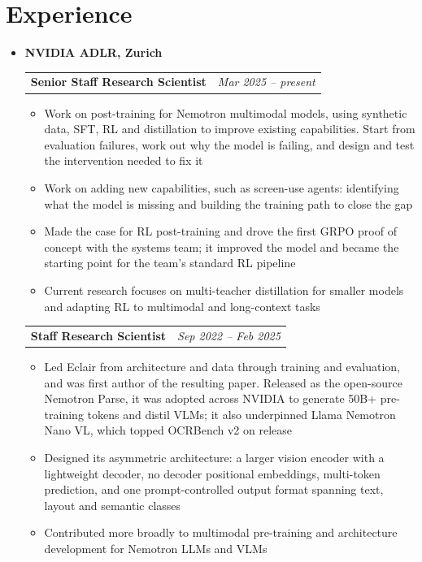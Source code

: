 \documentclass[letterpaper,11pt]{article}
\makeatletter
\newcommand{\cvcompany}[1]{
  \vspace{2pt}\item \textbf{#1} \\[1pt]
}
\newcommand{\cvrole}[2]{
    \begin{tabular*}{0.97\textwidth}[t]{l@{\extracolsep{\fill}}r}
      \textbf{#1} & \textit{\small #2} \\
    \end{tabular*}\vspace{-7pt}
}
\makeatother
\begin{document}
\section{Experience}
  \begin{itemize}[leftmargin=0.15in, label={}]

    \cvcompany{NVIDIA ADLR, Zurich}
      \cvrole{Senior Staff Research Scientist}{Mar 2025 -- present}
      \begin{itemize}
        \item Work on post-training for Nemotron multimodal models, using synthetic data, SFT, RL and distillation to improve existing capabilities. Start from evaluation failures, work out why the model is failing, and design and test the intervention needed to fix it
        \item Work on adding new capabilities, such as screen-use agents: identifying what the model is missing and building the training path to close the gap
        \item Made the case for RL post-training and drove the first GRPO proof of concept with the systems team; it improved the model and became the starting point for the team's standard RL pipeline
        \item Current research focuses on multi-teacher distillation for smaller models and adapting RL to multimodal and long-context tasks
      \end{itemize}
      \cvrole{Staff Research Scientist}{Sep 2022 -- Feb 2025}
      \begin{itemize}
        \item Led Eclair from architecture and data through training and evaluation, and was first author of the resulting paper. Released as the open-source Nemotron Parse, it was adopted across NVIDIA to generate 50B+ pre-training tokens and distil VLMs; it also underpinned Llama Nemotron Nano VL, which topped OCRBench v2 on release
        \item Designed its asymmetric architecture: a larger vision encoder with a lightweight decoder, no decoder positional embeddings, multi-token prediction, and one prompt-controlled output format spanning text, layout and semantic classes
        \item Contributed more broadly to multimodal pre-training and architecture development for Nemotron LLMs and VLMs
      \end{itemize}


\end{itemize}
\end{document}
